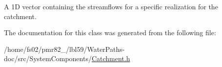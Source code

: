 A 1D vector containing the streamflows for a specific realization for the catchment. 



The documentation for this class was generated from the following file\+:\begin{DoxyCompactItemize}
\item 
/home/fs02/pmr82\+\_/lbl59/\+Water\+Paths-\/doc/src/\+System\+Components/\mbox{\hyperlink{Catchment_8h}{Catchment.\+h}}\end{DoxyCompactItemize}
